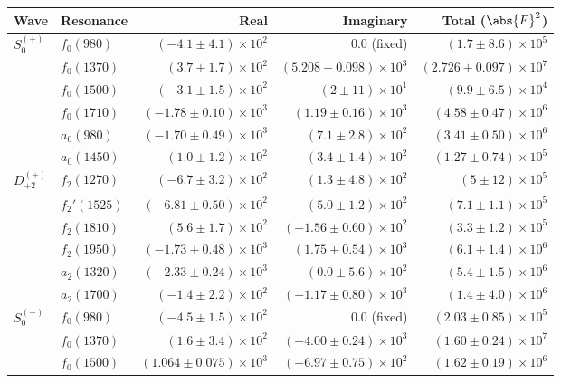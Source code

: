 \begin{table}[ht]
    \begin{center}
        \begin{tabular}{llrrr}\toprule
        Wave & Resonance & Real & Imaginary & Total ($\abs{F}^2$) \\\midrule
$S_{0}^{(+)}$ & $f_{0}(980)$ & $(-4.1 \pm 4.1) \times 10^{2}$ & $0.0$ (fixed) & $(1.7 \pm 8.6) \times 10^{5}$ \\
 & $f_{0}(1370)$ & $(3.7 \pm 1.7) \times 10^{2}$ & $(5.208 \pm 0.098) \times 10^{3}$ & $(2.726 \pm 0.097) \times 10^{7}$ \\
 & $f_{0}(1500)$ & $(-3.1 \pm 1.5) \times 10^{2}$ & $(2 \pm 11) \times 10^{1}$ & $(9.9 \pm 6.5) \times 10^{4}$ \\
 & $f_{0}(1710)$ & $(-1.78 \pm 0.10) \times 10^{3}$ & $(1.19 \pm 0.16) \times 10^{3}$ & $(4.58 \pm 0.47) \times 10^{6}$ \\
 & $a_{0}(980)$ & $(-1.70 \pm 0.49) \times 10^{3}$ & $(7.1 \pm 2.8) \times 10^{2}$ & $(3.41 \pm 0.50) \times 10^{6}$ \\
 & $a_{0}(1450)$ & $(1.0 \pm 1.2) \times 10^{2}$ & $(3.4 \pm 1.4) \times 10^{2}$ & $(1.27 \pm 0.74) \times 10^{5}$ \\
$D_{+2}^{(+)}$ & $f_{2}(1270)$ & $(-6.7 \pm 3.2) \times 10^{2}$ & $(1.3 \pm 4.8) \times 10^{2}$ & $(5 \pm 12) \times 10^{5}$ \\
 & $f_{2}'(1525)$ & $(-6.81 \pm 0.50) \times 10^{2}$ & $(5.0 \pm 1.2) \times 10^{2}$ & $(7.1 \pm 1.1) \times 10^{5}$ \\
 & $f_{2}(1810)$ & $(5.6 \pm 1.7) \times 10^{2}$ & $(-1.56 \pm 0.60) \times 10^{2}$ & $(3.3 \pm 1.2) \times 10^{5}$ \\
 & $f_{2}(1950)$ & $(-1.73 \pm 0.48) \times 10^{3}$ & $(1.75 \pm 0.54) \times 10^{3}$ & $(6.1 \pm 1.4) \times 10^{6}$ \\
 & $a_{2}(1320)$ & $(-2.33 \pm 0.24) \times 10^{3}$ & $(0.0 \pm 5.6) \times 10^{2}$ & $(5.4 \pm 1.5) \times 10^{6}$ \\
 & $a_{2}(1700)$ & $(-1.4 \pm 2.2) \times 10^{2}$ & $(-1.17 \pm 0.80) \times 10^{3}$ & $(1.4 \pm 4.0) \times 10^{6}$ \\
$S_{0}^{(-)}$ & $f_{0}(980)$ & $(-4.5 \pm 1.5) \times 10^{2}$ & $0.0$ (fixed) & $(2.03 \pm 0.85) \times 10^{5}$ \\
 & $f_{0}(1370)$ & $(1.6 \pm 3.4) \times 10^{2}$ & $(-4.00 \pm 0.24) \times 10^{3}$ & $(1.60 \pm 0.24) \times 10^{7}$ \\
 & $f_{0}(1500)$ & $(1.064 \pm 0.075) \times 10^{3}$ & $(-6.97 \pm 0.75) \times 10^{2}$ & $(1.62 \pm 0.19) \times 10^{6}$ \\

\end{tabular}
\end{center}
\end{table}
